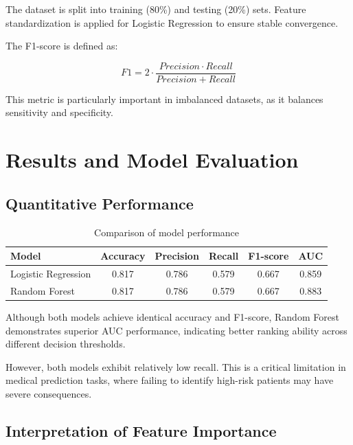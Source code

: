 \documentclass[11pt]{article}
\begin{document}
	The dataset is split into training (80\%) and testing (20\%) sets. Feature standardization is applied for Logistic Regression to ensure stable convergence.
	
	The F1-score is defined as:
	
	\begin{equation}
		F1 = 2 \cdot \frac{Precision \cdot Recall}{Precision + Recall}
	\end{equation}
	
	This metric is particularly important in imbalanced datasets, as it balances sensitivity and specificity.
	
	\section{Results and Model Evaluation}
	
	\subsection{Quantitative Performance}
	
	\begin{table}[H]
		\centering
		\begin{tabular}{lccccc}
			\toprule
			Model & Accuracy & Precision & Recall & F1-score & AUC \\
			\midrule
			Logistic Regression & 0.817 & 0.786 & 0.579 & 0.667 & 0.859 \\
			Random Forest & 0.817 & 0.786 & 0.579 & 0.667 & 0.883 \\
			\bottomrule
		\end{tabular}
		\caption{Comparison of model performance}
	\end{table}
	
	Although both models achieve identical accuracy and F1-score, Random Forest demonstrates superior AUC performance, indicating better ranking ability across different decision thresholds.
	
	However, both models exhibit relatively low recall. This is a critical limitation in medical prediction tasks, where failing to identify high-risk patients may have severe consequences.
	
	\subsection{Interpretation of Feature Importance}
	
\end{document}
